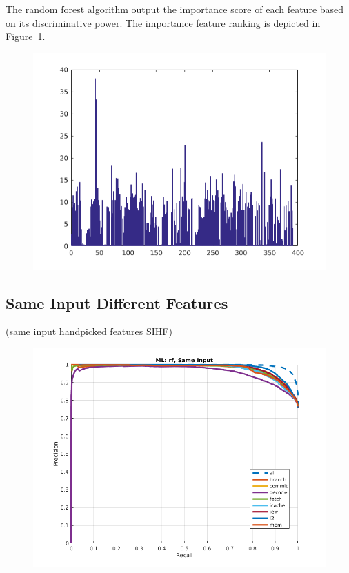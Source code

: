 The random forest algorithm output the importance score of each feature based on its discriminative power. The importance feature ranking is depicted in Figure~\ref{fig:feat-same}.
\begin{figure}[t]
\begin{center}
   \includegraphics[width=0.95\linewidth]{./figures/feat_same.png}
\end{center}
   \caption{}
\label{fig:feat-same}
\end{figure}

\subsection{Same Input Different Features}
(same input handpicked features SIHF)

\begin{figure}[t]
\begin{center}
   \includegraphics[width=0.95\linewidth]{./figures/sidf.png}
\end{center}
   \caption{}
\label{fig:sidf}
\end{figure}

